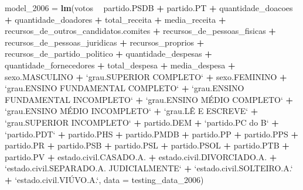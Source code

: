 \documentclass[]{article}
\newenvironment{Shaded}{\begin{snugshade}}{\end{snugshade}}
\newcommand{\KeywordTok}[1]{\textcolor[rgb]{0.13,0.29,0.53}{\textbf{#1}}}
\newcommand{\DataTypeTok}[1]{\textcolor[rgb]{0.13,0.29,0.53}{#1}}
\newcommand{\DecValTok}[1]{\textcolor[rgb]{0.00,0.00,0.81}{#1}}
\newcommand{\StringTok}[1]{\textcolor[rgb]{0.31,0.60,0.02}{#1}}
\newcommand{\OperatorTok}[1]{\textcolor[rgb]{0.81,0.36,0.00}{\textbf{#1}}}
\newcommand{\NormalTok}[1]{#1}
\begin{document}
\begin{Shaded}
\begin{Highlighting}[]
\NormalTok{model_}\DecValTok{2006}\NormalTok{ =}\StringTok{ }\KeywordTok{lm}\NormalTok{(votos }\OperatorTok{~}\StringTok{ }\NormalTok{partido.PSDB }\OperatorTok{+}\StringTok{ }\NormalTok{partido.PT }\OperatorTok{+}\StringTok{ }\NormalTok{quantidade_doacoes }\OperatorTok{+}\StringTok{ }\NormalTok{quantidade_doadores }\OperatorTok{+}\StringTok{ }\NormalTok{total_receita }\OperatorTok{+}\StringTok{ }\NormalTok{media_receita}
                \OperatorTok{+}\StringTok{ }\NormalTok{recursos_de_outros_candidatos.comites }\OperatorTok{+}\StringTok{ }\NormalTok{recursos_de_pessoas_fisicas }\OperatorTok{+}\StringTok{ }\NormalTok{recursos_de_pessoas_juridicas}
                \OperatorTok{+}\StringTok{ }\NormalTok{recursos_proprios }\OperatorTok{+}\StringTok{ }\NormalTok{recursos_de_partido_politico }\OperatorTok{+}\StringTok{ }\NormalTok{quantidade_despesas }\OperatorTok{+}\StringTok{ }\NormalTok{quantidade_fornecedores}
                \OperatorTok{+}\StringTok{ }\NormalTok{total_despesa }\OperatorTok{+}\StringTok{  }\NormalTok{media_despesa }\OperatorTok{+}\StringTok{ }\NormalTok{sexo.MASCULINO }\OperatorTok{+}\StringTok{ `}\DataTypeTok{grau.SUPERIOR COMPLETO}\StringTok{`} \OperatorTok{+}\StringTok{ }\NormalTok{sexo.FEMININO}
                \OperatorTok{+}\StringTok{ `}\DataTypeTok{grau.ENSINO FUNDAMENTAL COMPLETO}\StringTok{`} \OperatorTok{+}\StringTok{ `}\DataTypeTok{grau.ENSINO FUNDAMENTAL INCOMPLETO}\StringTok{`} \OperatorTok{+}\StringTok{ `}\DataTypeTok{grau.ENSINO MÉDIO COMPLETO}\StringTok{`}
                \OperatorTok{+}\StringTok{ `}\DataTypeTok{grau.ENSINO MÉDIO INCOMPLETO}\StringTok{`} \OperatorTok{+}\StringTok{ `}\DataTypeTok{grau.LÊ E ESCREVE}\StringTok{`} \OperatorTok{+}\StringTok{ `}\DataTypeTok{grau.SUPERIOR INCOMPLETO}\StringTok{`} \OperatorTok{+}\StringTok{ }\NormalTok{partido.DEM}
                \OperatorTok{+}\StringTok{ `}\DataTypeTok{partido.PC do B}\StringTok{`} \OperatorTok{+}\StringTok{ `}\DataTypeTok{partido.PDT}\StringTok{`} \OperatorTok{+}\StringTok{ }\NormalTok{partido.PHS }\OperatorTok{+}\StringTok{ }\NormalTok{partido.PMDB }\OperatorTok{+}\StringTok{ }\NormalTok{partido.PP }\OperatorTok{+}\StringTok{ }\NormalTok{partido.PPS }\OperatorTok{+}\StringTok{ }\NormalTok{partido.PR}
                \OperatorTok{+}\StringTok{ }\NormalTok{partido.PSB }\OperatorTok{+}\StringTok{ }\NormalTok{partido.PSL }\OperatorTok{+}\StringTok{ }\NormalTok{partido.PSOL }\OperatorTok{+}\StringTok{ }\NormalTok{partido.PTB }\OperatorTok{+}\StringTok{ }\NormalTok{partido.PV }\OperatorTok{+}\StringTok{ }\NormalTok{estado.civil.CASADO.A. }\OperatorTok{+}\StringTok{ }\NormalTok{estado.civil.DIVORCIADO.A.}
                \OperatorTok{+}\StringTok{ `}\DataTypeTok{estado.civil.SEPARADO.A. JUDICIALMENTE}\StringTok{`} \OperatorTok{+}\StringTok{ `}\DataTypeTok{estado.civil.SOLTEIRO.A.}\StringTok{`} \OperatorTok{+}\StringTok{ `}\DataTypeTok{estado.civil.VIÚVO.A.}\StringTok{`}\NormalTok{,}
                \DataTypeTok{data =}\NormalTok{ testing_data_}\DecValTok{2006}\NormalTok{)}
\end{Highlighting}
\end{Shaded}
\end{document}
